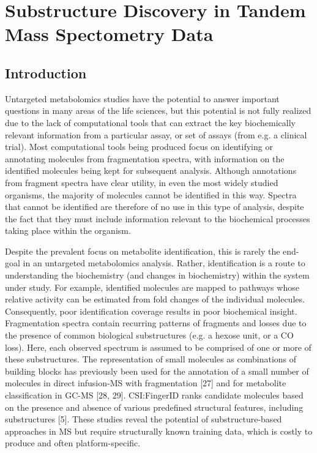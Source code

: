 \chapter{Substructure Discovery in Tandem Mass Spectometry Data}
\label{c:background}


\section{Introduction}

Untargeted metabolomics studies have the potential to answer important questions in many areas of the life sciences, but this potential is not fully realized due to the lack of computational tools that can extract the key biochemically relevant information from a particular assay, or set of assays (from e.g. a clinical trial). Most computational tools being produced focus on identifying or annotating molecules from fragmentation spectra, with information on the identified molecules being kept for subsequent analysis. Although annotations from fragment spectra have clear utility, in even the most widely studied organisms, the majority of molecules cannot be identified in this way. Spectra that cannot be identified are therefore of no use in this type of analysis, despite the fact that they must include information relevant to the biochemical processes taking place within the organism. 

Despite the prevalent focus on metabolite identification, this is rarely the end-goal in an untargeted metabolomics analysis. Rather, identification is a route to understanding the biochemistry (and changes in biochemistry) within the system under study. For example, identified molecules are mapped to pathways whose relative activity can be estimated from fold changes of the individual molecules. Consequently, poor identification coverage results in poor biochemical insight. Fragmentation spectra contain recurring patterns of fragments and losses due to the presence of common biological substructures (e.g. a hexose unit, or a CO loss). Here, each observed spectrum is assumed to be comprised of one or more of these substructures. The representation of small molecules as combinations of building blocks has previously been used for the annotation of a small number of molecules in direct infusion-MS with fragmentation [27] and for metabolite classification in GC-MS [28, 29]. CSI:FingerID ranks candidate molecules based on the presence and absence of various predefined structural features, including substructures [5]. These studies reveal the potential of substructure-based approaches in MS but require structurally known training data, which is costly to produce and often platform-specific. 


